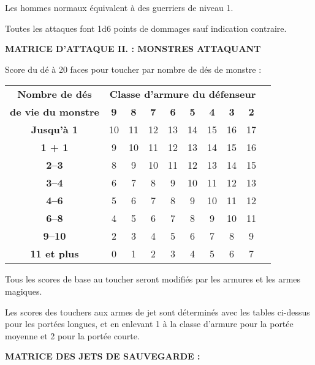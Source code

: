 \bigskip

Les hommes normaux équivalent à des guerriers de niveau 1.

\bigskip

Toutes les attaques font 1d6 points de dommages sauf indication contraire.

\bigskip

\textbf{MATRICE D'ATTAQUE II. : MONSTRES ATTAQUANT}

\bigskip

Score du dé à 20 faces pour toucher par nombre de dés de monstre :

\bigskip

\begin{tabular}{cccccccccc}
\textbf{Nombre de dés} & \multicolumn{8}{c}{\textbf{Classe d'armure du défenseur}} \\
\textbf{de vie du monstre}  & \textbf{9} & \textbf{8} & \textbf{7} & \textbf{6} & \textbf{5} & \textbf{4} & \textbf{3} & \textbf{2} \\
\textbf{Jusqu'à 1}          & 10 & 11 & 12 & 13 & 14 & 15 & 16 & 17 \\
\textbf{1 + 1}              &  9 & 10 & 11 & 12 & 13 & 14 & 15 & 16 \\
\textbf{2--3}               &  8 &  9 & 10 & 11 & 12 & 13 & 14 & 15 \\
\textbf{3--4}               &  6 &  7 &  8 &  9 & 10 & 11 & 12 & 13 \\
\textbf{4--6}               &  5 &  6 &  7 &  8 &  9 & 10 & 11 & 12 \\
\textbf{6--8}               &  4 &  5 &  6 &  7 &  8 &  9 & 10 & 11 \\
\textbf{9--10}              &  2 &  3 &  4 &  5 &  6 &  7 &  8 &  9 \\
\textbf{11 et plus}         &  0 &  1 &  2 &  3 &  4 &  5 &  6 &  7 \\
\end{tabular}

\bigskip

Tous les scores de base au toucher seront modifiés par les armures et les armes magiques.

\bigskip

Les scores des touchers aux armes de jet sont déterminés avec les tables ci-dessus pour les portées longues, et en enlevant 1 à la classe d'armure pour la portée moyenne et 2 pour la portée courte.

\bigskip

\textbf{MATRICE DES JETS DE SAUVEGARDE :}

